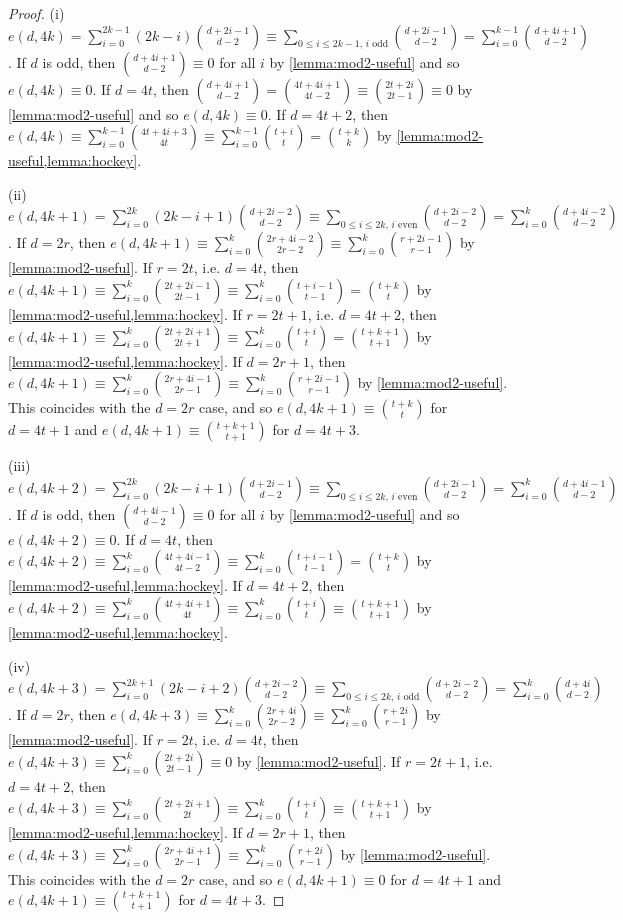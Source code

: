 \documentclass[11pt,a4paper,leqno]{amsart}
\theoremstyle{definition}
\theoremstyle{remark}
\begin{document}
\begin{proof}
(i) $e(d,4k) = \sum_{i=0}^{2k-1} (2k-i) \binom{d+2i-1}{d-2} \equiv \sum_{0 \le i \le 2k-1, \,\text{$i$ odd}} \binom{d+2i-1}{d-2} = \sum_{i=0}^{k-1} \binom{d+4i+1}{d-2}$. If $d$ is odd, then $\binom{d+4i+1}{d-2} \equiv 0$ for all $i$ by \cref{lemma:mod2-useful} and so $e(d,4k) \equiv 0$. If $d = 4t$, then $\binom{d+4i+1}{d-2} = \binom{4t+4i+1}{4t-2} \equiv \binom{2t+2i}{2t-1} \equiv 0$ by \cref{lemma:mod2-useful} and so $e(d,4k) \equiv 0$. If $d = 4t+2$, then $e(d,4k) \equiv \sum_{i=0}^{k-1} \binom{4t+4i+3}{4t} \equiv \sum_{i=0}^{k-1} \binom{t+i}{t} = \binom{t+k}{k}$ by \cref{lemma:mod2-useful,lemma:hockey}.

(ii) $e(d,4k+1) = \sum_{i=0}^{2k} (2k-i+1) \binom{d+2i-2}{d-2} \equiv \sum_{0 \le i \le 2k, \,\text{$i$ even}} \binom{d+2i-2}{d-2} = \sum_{i=0}^k \binom{d+4i-2}{d-2}$.
If $d=2r$, then $e(d,4k+1) \equiv \sum_{i=0}^k \binom{2r+4i-2}{2r-2} \equiv \sum_{i=0}^k \binom{r+2i-1}{r-1}$ by \cref{lemma:mod2-useful}. 
If $r = 2t$, i.e. $d=4t$, then $e(d,4k+1) \equiv \sum_{i=0}^k \binom{2t+2i-1}{2t-1} \equiv \sum_{i=0}^k \binom{t+i-1}{t-1} = \binom{t+k}{t}$ by \cref{lemma:mod2-useful,lemma:hockey}. If $r=2t+1$, i.e. $d=4t+2$, then $e(d,4k+1) \equiv \sum_{i=0}^k \binom{2t+2i+1}{2t+1} \equiv \sum_{i=0}^k \binom{t+i}{t} = \binom{t+k+1}{t+1}$ by \cref{lemma:mod2-useful,lemma:hockey}. 
If $d=2r+1$, then $e(d,4k+1) \equiv \sum_{i=0}^k \binom{2r+4i-1}{2r-1} \equiv \sum_{i=0}^k \binom{r+2i-1}{r-1}$ by \cref{lemma:mod2-useful}.
This coincides with the $d=2r$ case, and so $e(d,4k+1) \equiv \binom{t+k}{t}$ for $d=4t+1$ and $e(d,4k+1) \equiv \binom{t+k+1}{t+1}$ for $d=4t+3$.

(iii) $e(d,4k+2) = \sum_{i=0}^{2k} (2k-i+1) \binom{d+2i-1}{d-2} \equiv \sum_{0 \le i \le 2k, \,\text{$i$ even}} \binom{d+2i-1}{d-2} = \sum_{i=0}^k \binom{d+4i-1}{d-2}$.
If $d$ is odd, then $\binom{d+4i-1}{d-2} \equiv 0$ for all $i$ by \cref{lemma:mod2-useful} and so $e(d,4k+2) \equiv 0$.
If $d=4t$, then $e(d,4k+2) \equiv \sum_{i=0}^k \binom{4t+4i-1}{4t-2} \equiv \sum_{i=0}^k \binom{t+i-1}{t-1} = \binom{t+k}{t}$ by \cref{lemma:mod2-useful,lemma:hockey}.
If $d=4t+2$, then $e(d,4k+2) \equiv \sum_{i=0}^k \binom{4t+4i+1}{4t} \equiv \sum_{i=0}^k \binom{t+i}{t} \equiv \binom{t+k+1}{t+1}$ by \cref{lemma:mod2-useful,lemma:hockey}.

(iv) $e(d,4k+3) = \sum_{i=0}^{2k+1} (2k-i+2) \binom{d+2i-2}{d-2} \equiv \sum_{0 \le i \le 2k, \,\text{$i$ odd}} \binom{d+2i-2}{d-2} = \sum_{i=0}^k \binom{d+4i}{d-2}$.
If $d=2r$, then $e(d,4k+3) \equiv \sum_{i=0}^k \binom{2r+4i}{2r-2} \equiv \sum_{i=0}^k \binom{r+2i}{r-1}$ by \cref{lemma:mod2-useful}. If $r=2t$, i.e. $d=4t$, then $e(d,4k+3) \equiv \sum_{i=0}^k \binom{2t+2i}{2t-1} \equiv 0$ by \cref{lemma:mod2-useful}.
If $r=2t+1$, i.e. $d=4t+2$, then $e(d,4k+3) \equiv \sum_{i=0}^k \binom{2t+2i+1}{2t} \equiv \sum_{i=0}^k \binom{t+i}{t} \equiv \binom{t+k+1}{t+1}$ by \cref{lemma:mod2-useful,lemma:hockey}.
If $d=2r+1$, then $e(d,4k+3) \equiv \sum_{i=0}^k \binom{2r+4i+1}{2r-1} \equiv  \sum_{i=0}^k \binom{r+2i}{r-1}$ by \cref{lemma:mod2-useful}. 
This coincides with the $d=2r$ case, and so $e(d,4k+1) \equiv 0$ for $d=4t+1$ and $e(d,4k+1) \equiv \binom{t+k+1}{t+1}$ for $d=4t+3$.
\end{proof}
\end{document}
